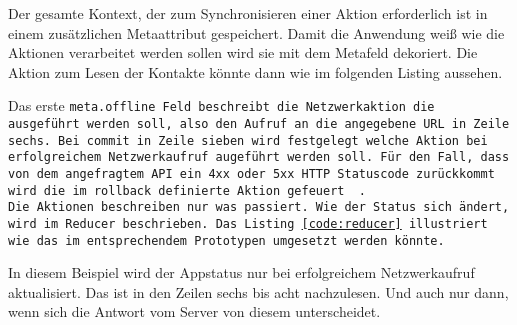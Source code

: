 Der gesamte Kontext, der zum Synchronisieren einer Aktion erforderlich ist in einem zusätzlichen Metaattribut gespeichert.
Damit die Anwendung weiß wie die Aktionen verarbeitet werden sollen wird sie mit dem Metafeld dekoriert. Die Aktion zum Lesen der Kontakte könnte dann wie im folgenden Listing aussehen.
%
\begin{center}
  
\end{center}
%
Das erste \tt{meta.offline} Feld beschreibt die Netzwerkaktion die ausgeführt werden soll, also den Aufruf an die angegebene URL in Zeile sechs.
Bei \tt{commit} in Zeile sieben wird festgelegt welche Aktion bei erfolgreichem Netzwerkaufruf augeführt werden soll.
Für den Fall, dass von dem angefragtem \gls{API} ein 4xx oder 5xx \gls{HTTP} Statuscode zurückkommt wird die im \tt{rollback} definierte Aktion gefeuert ~\cite{redux-offline-npm}.\\
Die Aktionen beschreiben nur was passiert. Wie der Status sich ändert, wird im \tt{Reducer} beschrieben.
Das Listing \ref{code:reducer} illustriert wie das im entsprechendem Prototypen umgesetzt werden könnte.
%
\begin{center}
  
\end{center}
%
In diesem Beispiel wird der \gls{App}status nur bei erfolgreichem Netzwerkaufruf aktualisiert. Das ist in den Zeilen sechs bis acht nachzulesen. Und auch nur dann, wenn sich die Antwort vom Server von diesem unterscheidet.